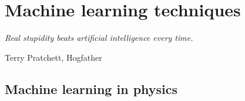 \documentclass[11pt, a4paper]{report} %
\begin{document}
\begin{table}
\centering
{}
\caption{Number of states required for a given sum rule saturation in the XXZ model with \(\Delta=0.6\) and \(S_{\mathrm{tot}}^z=0.1\).
In parentheses are the fraction Hilbert space fraction this represents.
Table reproduced from~\cite{Caux2009}.
}
\label{table:saturation}
\end{table}



\chapter{Machine learning techniques}\label{chap:machine_learning}

\epigraph{\textit{Real stupidity beats artificial intelligence every time.}}{Terry Pratchett, Hogfather}

\section{Machine learning in physics}
\end{document}
